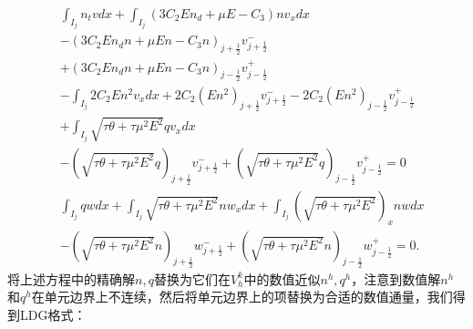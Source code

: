\begin{align}
     & \int_{I_{j}} n_{t} v d x+\int_{I_{j}}\left(3 C_{2} E n_{d}+\mu E-C_{3}\right) n v_{x} d x                                                                          \nonumber                                              \\
     & -\left(3 C_{2} E n_{d} n+\mu E n-C_{3} n\right)_{j+\frac{1}{2}} v_{j+\frac{1}{2}}^{-}                                                                                       \nonumber                                     \\
     & +\left(3 C_{2} E n_{d} n+\mu E n-C_{3} n\right)_{j-\frac{1}{2}} v_{j-\frac{1}{2}}^{+}                                                                                      \nonumber                                      \\
     & -\int_{I_{j}} 2 C_{2} E n^{2} v_{x} d x+2 C_{2}\left(E n^{2}\right)_{j+\frac{1}{2}} v_{j+\frac{1}{2}}^{-}-2 C_{2}\left(E n^{2}\right)_{j-\frac{1}{2}} v_{j-\frac{1}{2}}^{+}           \nonumber                           \\
     & +\int_{I_{j}} \sqrt{\tau \theta+\tau \mu^{2} E^{2}} q v_{x} d x                                                                                               \nonumber                                                   \\
     & -\left(\sqrt{\tau \theta+\tau \mu^{2} E^{2}} q\right)_{j+\frac{1}{2}} v_{j+\frac{1}{2}}^{-}+\left(\sqrt{\tau \theta+\tau \mu^{2} E^{2}} q\right)_{j-\frac{1}{2}} v_{j-\frac{1}{2}}^{+}=0  \label{eq:HFRewrittenWeakForma} \\
     & \int_{I_{j}} q w d x+\int_{I_{j}} \sqrt{\tau \theta+\tau \mu^{2} E^{2}} n w_{x} d x+\int_{I_{j}}\left(\sqrt{\tau \theta+\tau \mu^{2} E^{2}}\right)_{x} n w d x    \nonumber                                               \\
     & -\left(\sqrt{\tau \theta+\tau \mu^{2} E^{2}} n\right)_{j+\frac{1}{2}} w_{j+\frac{1}{2}}^{-}+\left(\sqrt{\tau \theta+\tau \mu^{2} E^{2}} n\right)_{j-\frac{1}{2}} w_{j-\frac{1}{2}}^{+}=0 .\label{eq:HFRewrittenWeakFormb}
\end{align}
将上述方程中的精确解$n, q$替换为它们在$V_{h}^{k}$中的数值近似$n^{h}, q^{h}$，注意到数值解$n^{h}$和$q^{h}$在单元边界上不连续，然后将单元边界上的项替换为合适的数值通量，我们得到LDG格式：
